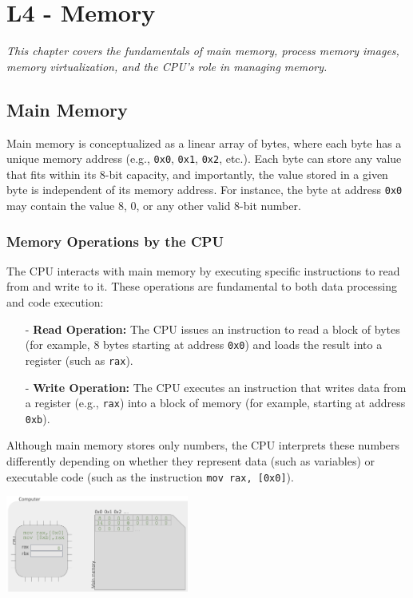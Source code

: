 \chapter{L4 - Memory}
\textit{This chapter covers the fundamentals of main memory, process memory images, memory virtualization, and the CPU's role in managing memory.}
\vspace{15px}
\section{Main Memory}
Main memory is conceptualized as a linear array of bytes, where each byte has a unique memory address (e.g., \texttt{0x0}, \texttt{0x1}, \texttt{0x2}, etc.). Each byte can store any value that fits within its 8-bit capacity, and importantly, the value stored in a given byte is independent of its memory address. For instance, the byte at address \texttt{0x0} may contain the value 8, 0, or any other valid 8-bit number.

\subsection{Memory Operations by the CPU}
The CPU interacts with main memory by executing specific instructions to read from and write to it. These operations are fundamental to both data processing and code execution:

\begin{itemize}
  \item[-] \textbf{Read Operation:} The CPU issues an instruction to read a block of bytes (for example, 8 bytes starting at address \texttt{0x0}) and loads the result into a register (such as \texttt{rax}).
  \item[-] \textbf{Write Operation:} The CPU executes an instruction that writes data from a register (e.g., \texttt{rax}) into a block of memory (for example, starting at address \texttt{0xb}).
\end{itemize}

Although main memory stores only numbers, the CPU interprets these numbers differently depending on whether they represent data (such as variables) or executable code (such as the instruction \texttt{mov rax, [0x0]}).

\begin{center}
  \includegraphics[width=0.45\textwidth]{chapters/L4/images/main-mem.png}
\end{center}
\newpage
